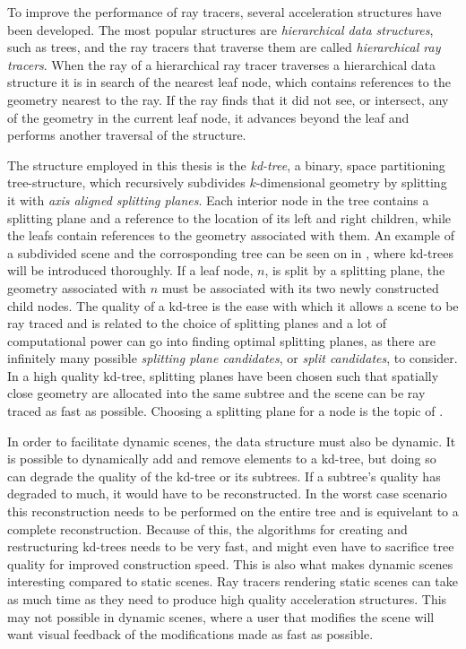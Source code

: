 
To improve the performance of ray tracers, several acceleration
structures have been developed. The most popular structures are
\textit{hierarchical data structures}, such as trees, and the ray
tracers that traverse them are called \textit{hierarchical ray
  tracers}. When the ray of a hierarchical ray tracer traverses a
hierarchical data structure it is in search of the nearest leaf node,
which contains references to the geometry nearest to the ray. If the
ray finds that it did not see, or intersect, any of the geometry in
the current leaf node, it advances beyond the leaf and performs
another traversal of the structure.

The structure employed in this thesis is the \textit{kd-tree}, a binary, space
partitioning tree-structure, which recursively subdivides $k$-dimensional
geometry by splitting it with \textit{axis aligned splitting planes}. Each
interior node in the tree contains a splitting plane and a reference to the
location of its left and right children, while the leafs contain references to
the geometry associated with them. An example of a subdivided scene and the
corrosponding tree can be seen on  in
, where kd-trees will be introduced thoroughly. If a
leaf node, $n$, is split by a splitting plane, the geometry associated with $n$
must be associated with its two newly constructed child nodes. The quality of a
kd-tree is the ease with which it allows a scene to be ray traced and is related
to the choice of splitting planes and a lot of computational power can go into
finding optimal splitting planes, as there are infinitely many possible
\textit{splitting plane candidates}, or \textit{split candidates}, to
consider. In a high quality kd-tree, splitting planes have been chosen such that
spatially close geometry are allocated into the same subtree and the scene can
be ray traced as fast as possible. Choosing a splitting plane for a node is the
topic of .

In order to facilitate dynamic scenes, the data structure must also be
dynamic. It is possible to dynamically add and remove elements to a kd-tree, but
doing so can degrade the quality of the kd-tree or its subtrees. If a subtree's
quality has degraded to much, it would have to be reconstructed. In the worst
case scenario this reconstruction needs to be performed on the entire tree and
is equivelant to a complete reconstruction. Because of this, the algorithms for
creating and restructuring kd-trees needs to be very fast, and might even have
to sacrifice tree quality for improved construction speed. This is also what
makes dynamic scenes interesting compared to static scenes. Ray tracers
rendering static scenes can take as much time as they need to produce high
quality acceleration structures. This may not possible in dynamic scenes, where
a user that modifies the scene will want visual feedback of the modifications
made as fast as possible.

